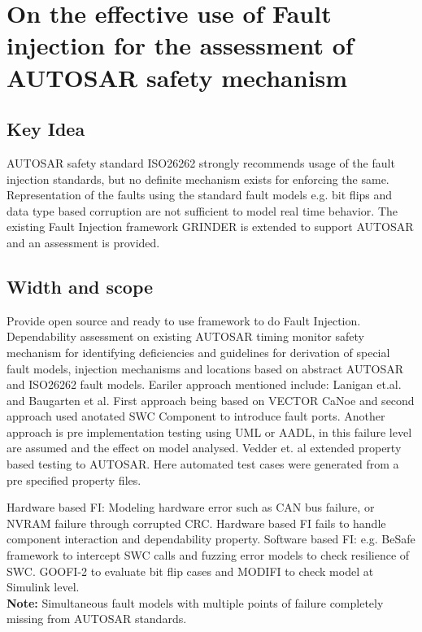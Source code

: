 
\section{On the effective use of Fault injection for the assessment of AUTOSAR safety mechanism} %
\subsection{Key Idea} %
AUTOSAR safety standard ISO26262 strongly recommends usage of the fault injection standards, but no definite mechanism exists for enforcing the same.
Representation of the faults using the standard fault models e.g. bit flips and data type based corruption are not sufficient to model real time behavior.
The existing Fault Injection framework GRINDER is extended to support AUTOSAR and an assessment is provided.
\subsection{Width and scope} %
Provide open source and ready to use framework to do Fault Injection. Dependability  assessment on existing AUTOSAR timing monitor safety mechanism for identifying 
deficiencies and guidelines for derivation of special fault models, injection mechanisms and locations based on abstract AUTOSAR and ISO26262 fault models.
Eariler approach mentioned include: Lanigan et.al. and Baugarten et al. First approach being based on VECTOR CaNoe and second approach used anotated SWC Component to 
introduce fault ports. Another approach is pre implementation testing using UML or AADL, in this failure level are assumed and the effect on model analysed.
Vedder et. al extended property based testing to AUTOSAR. Here automated test cases were generated from a pre specified property files.

Hardware based FI: Modeling hardware error such as CAN bus failure, or NVRAM failure through corrupted CRC. Hardware based FI fails to handle component interaction and
dependability property.
Software based FI: e.g. BeSafe framework to intercept SWC calls and fuzzing error models to check resilience of SWC. GOOFI-2 to evaluate bit flip cases and  MODIFI to check model
at Simulink level.\\
\textbf{Note:} Simultaneous fault models with multiple points of failure completely missing from AUTOSAR standards.

